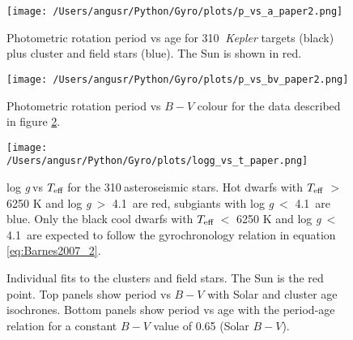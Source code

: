 \documentclass[11pt,preprint]{aastex}
\newcommand{\logg}{log \emph{g}}
\newcommand{\teff}{$T_{\rm{eff}}$}
\newcommand{\nastero}{310}
\newcommand{\subcut}{4.1~}
\begin{document}



\begin{figure}[ht]
\begin{center}
\texttt{[image: /Users/angusr/Python/Gyro/plots/p\_vs\_a\_paper2.png]}
\caption{Photometric rotation period vs age for \nastero$~$ {\it Kepler} targets (black) plus cluster and field stars (blue). The Sun is shown in red.}
\label{fig:p_vs_a}
\end{center}
\end{figure}

\begin{figure}[ht]
\begin{center}
\texttt{[image: /Users/angusr/Python/Gyro/plots/p\_vs\_bv\_paper2.png]}
\caption{Photometric rotation period vs $B-V$ colour for the data described in figure \ref{fig:3d}.}
\label{fig:3d}
\end{center}
\end{figure}

\begin{figure}[ht]
\begin{center}
\texttt{[image: /Users/angusr/Python/Gyro/plots/logg\_vs\_t\_paper.png]}
\caption{\logg$~$vs \teff$~$for the \nastero$~$asteroseismic stars. Hot dwarfs with \teff$~>$ 6250 K and \logg$~>$ \subcut are red, subgiants with \logg$~<$ \subcut are blue. Only the black cool dwarfs with \teff$~<$ 6250 K and \logg$~<$ \subcut are expected to follow the gyrochronology relation in equation \ref{eq:Barnes2007_2}.}
\label{fig:logg_vs_t}
\end{center}
\end{figure}

\begin{figure}[ht]
\begin{center}
    \end{center}
    \caption{ Individual fits to the clusters and field stars. The Sun is the red point. Top panels show period vs $B-V$ with Solar and cluster age isochrones. Bottom panels show period vs age with the period-age relation for a constant $B-V$ value of 0.65 (Solar $B-V$).}
   \label{fig:subfigures2}
\end{figure}
\end{document}
